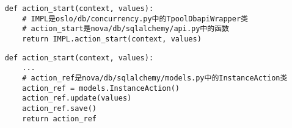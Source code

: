 \documentclass[a4paper,left=1.5cm,right=1.5cm,11pt]{article}
\begin{document}
	\begin{lstlisting}
	def action_start(context, values):
		# IMPL是oslo/db/concurrency.py中的TpoolDbapiWrapper类
		# action_start是nova/db/sqlalchemy/api.py中的函数
		return IMPL.action_start(context, values)
	\end{lstlisting}

	\begin{lstlisting}
	def action_start(context, values):
		...
		# action_ref是nova/db/sqlalchemy/models.py中的InstanceAction类
		action_ref = models.InstanceAction()
		action_ref.update(values)
		action_ref.save()
		return action_ref
	\end{lstlisting}
\end{document}
